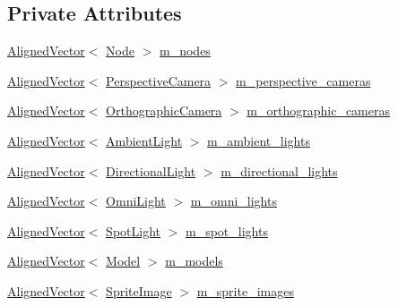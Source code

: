 \subsection*{Private Attributes}
\begin{DoxyCompactItemize}
\item 
\hyperlink{namespacemage_a8664bfb5ce2179fc64eae9f82c8a5ba8}{Aligned\+Vector}$<$ \hyperlink{classmage_1_1_node}{Node} $>$ \hyperlink{classmage_1_1_scene_a270ac4a26210b95ba05957af19c4c43c}{m\+\_\+nodes}
\item 
\hyperlink{namespacemage_a8664bfb5ce2179fc64eae9f82c8a5ba8}{Aligned\+Vector}$<$ \hyperlink{classmage_1_1_perspective_camera}{Perspective\+Camera} $>$ \hyperlink{classmage_1_1_scene_a73707ba421e5e1a74d1dd67679a0659a}{m\+\_\+perspective\+\_\+cameras}
\item 
\hyperlink{namespacemage_a8664bfb5ce2179fc64eae9f82c8a5ba8}{Aligned\+Vector}$<$ \hyperlink{classmage_1_1_orthographic_camera}{Orthographic\+Camera} $>$ \hyperlink{classmage_1_1_scene_a391e0e086241a4a8beb06f192ef3f1e8}{m\+\_\+orthographic\+\_\+cameras}
\item 
\hyperlink{namespacemage_a8664bfb5ce2179fc64eae9f82c8a5ba8}{Aligned\+Vector}$<$ \hyperlink{classmage_1_1_ambient_light}{Ambient\+Light} $>$ \hyperlink{classmage_1_1_scene_a23e6a98049fa7a4cc26b6d5521247d1a}{m\+\_\+ambient\+\_\+lights}
\item 
\hyperlink{namespacemage_a8664bfb5ce2179fc64eae9f82c8a5ba8}{Aligned\+Vector}$<$ \hyperlink{classmage_1_1_directional_light}{Directional\+Light} $>$ \hyperlink{classmage_1_1_scene_a10f42f0384140b36ffdf3db1adbe2120}{m\+\_\+directional\+\_\+lights}
\item 
\hyperlink{namespacemage_a8664bfb5ce2179fc64eae9f82c8a5ba8}{Aligned\+Vector}$<$ \hyperlink{classmage_1_1_omni_light}{Omni\+Light} $>$ \hyperlink{classmage_1_1_scene_a2bb85a932e82a06824c7075fcc2d4644}{m\+\_\+omni\+\_\+lights}
\item 
\hyperlink{namespacemage_a8664bfb5ce2179fc64eae9f82c8a5ba8}{Aligned\+Vector}$<$ \hyperlink{classmage_1_1_spot_light}{Spot\+Light} $>$ \hyperlink{classmage_1_1_scene_a6f8b7f605c83964334ee471cac448659}{m\+\_\+spot\+\_\+lights}
\item 
\hyperlink{namespacemage_a8664bfb5ce2179fc64eae9f82c8a5ba8}{Aligned\+Vector}$<$ \hyperlink{classmage_1_1_model}{Model} $>$ \hyperlink{classmage_1_1_scene_a5e37590d17c9bb0cc4f16ec7defb5180}{m\+\_\+models}
\item 
\hyperlink{namespacemage_a8664bfb5ce2179fc64eae9f82c8a5ba8}{Aligned\+Vector}$<$ \hyperlink{classmage_1_1_sprite_image}{Sprite\+Image} $>$ \hyperlink{classmage_1_1_scene_aa93cc1b45ac10df888cccab41aa33480}{m\+\_\+sprite\+\_\+images}

\end{DoxyCompactItemize}

